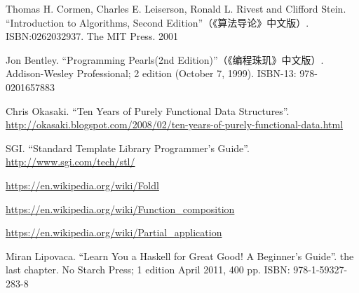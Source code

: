 \documentclass[b5paper]{ctexart}
\begin{document}
\begin{thebibliography}{99}

Thomas H. Cormen, Charles E. Leiserson, Ronald L. Rivest and Clifford Stein.
``Introduction to Algorithms, Second Edition''（《算法导论》中文版）. ISBN:0262032937. The MIT Press. 2001

Jon Bentley. ``Programming Pearls(2nd Edition)''（《编程珠玑》中文版）. Addison-Wesley Professional; 2 edition (October 7, 1999). ISBN-13: 978-0201657883

Chris Okasaki. ``Ten Years of Purely Functional Data Structures''. \url{http://okasaki.blogspot.com/2008/02/ten-years-of-purely-functional-data.html}

SGI. ``Standard Template Library Programmer's Guide''. \url{http://www.sgi.com/tech/stl/}

\url{https://en.wikipedia.org/wiki/Foldl}

\url{https://en.wikipedia.org/wiki/Function_composition}

\url{https://en.wikipedia.org/wiki/Partial_application}

Miran Lipovaca. ``Learn You a Haskell for Great Good! A Beginner's Guide''. the last chapter. No Starch Press; 1 edition April 2011, 400 pp. ISBN: 978-1-59327-283-8

\end{thebibliography}

\expandafter\enddocument
\fi
\end{document}

